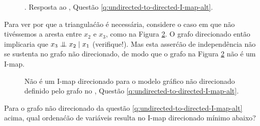 \begin{exenumerate}
\begin{solution}
\begin{figure}[h!]
{
        }
        \caption{\label{fig:undirected-to-directed-I-map-alt}. Resposta ao , Quest\~ao \ref{q:undirected-to-directed-I-map-alt}. }
        
    \end{figure}
    
    Para ver por que a triangula\'c\~ao \'e necess\'aria, considere o caso em que n\~ao tiv\'essemos a aresta entre $x_2$ e $x_3$, como na Figura \ref{fig:triangulation-alt}. O grafo direcionado ent\~ao implicaria que $x_3 \mathrel{\perp\mspace{-10mu}\perp} x_2 \mid x_1$ (verifique!). Mas esta asser\'c\~ao de independ\^encia n\~ao se sustenta no grafo n\~ao direcionado, de modo que o grafo na Figura \ref{fig:triangulation-alt} n\~ao \'e um I-map.
    
    \begin{figure}[h!]
        \centering
        \caption{\label{fig:triangulation-alt} N\~ao \'e um I-map direcionado para o modelo gr\'afico n\~ao direcionado definido pelo grafo no , Quest\~ao \ref{q:undirected-to-directed-I-map-alt}.}
    \end{figure}
\end{solution}

\item Para o grafo n\~ao direcionado da quest\~ao \ref{q:undirected-to-directed-I-map-alt} acima, qual ordena\'c\~ao de vari\'aveis resulta no I-map direcionado m\'inimo abaixo?
\label{q:undirected-to-directed-I-map-chordal-graph-variable-ordering-alt}
\begin{center}
\end{center}
\end{exenumerate}
